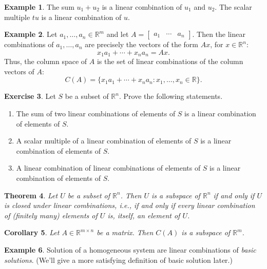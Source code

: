 \documentclass{amsart}
\newcommand{\RR}{\mathbb{R}}
\newtheorem{theorem}{Theorem}[section]
\newtheorem{corollary}[theorem]{Corollary}
\theoremstyle{definition}
\newtheorem{example}[theorem]{Example}
\newtheorem{exercise}[theorem]{Exercise}
\begin{document}
\begin{example}
  The sum $u_1+u_2$ is a linear combination of $u_1$ and $u_2$.
  The scalar multiple $tu$ is a linear combination of $u$.
\end{example}

\begin{example}\label{example:lin_combs_are_matvecs}
Let $a_1,\ldots,a_n\in\RR^m$ and let $A=\begin{bmatrix}a_1&\cdots &a_n\end{bmatrix}$.
  Then the linear combinations of $a_1,\ldots,a_n$ are precisely the vectors of the form $Ax$, for $x\in \RR^n$:
  $$
  x_1a_1+\cdots + x_na_n = Ax.
  $$
  Thus, the column space of $A$ is the set of linear combinations of the column vectors of $A$:
  $$
  C(A) = \{x_1a_1+\cdots+x_na_n : x_1, \ldots, x_n\in \RR\}.
  $$
\end{example}

\begin{exercise}\label{exerise:spans_are_subspaces}
Let $S$ be a subset of $\RR^n$. Prove the following statements.
\begin{enumerate}
  \item The sum of two linear combinations of elements of $S$ is a linear combination of elements of $S$.
  \item A scalar multiple of a linear combination of elements of $S$ is a linear combination of elements of $S$.
  \item A linear combination of linear combinations of elements of $S$ is a linear combination of elements of $S$.
\end{enumerate}
\end{exercise}

\begin{theorem}\label{theorem:subspaces_closed_under_lin_comb}
  Let $U$ be a subset of $\RR^n$.
  Then $U$ is a subspace of $\RR^n$ if and only if $U$ is \emph{closed under linear combinations}, i.e., if and only if every linear combination of (finitely many) elements of $U$ is, itself, an element of $U$.
\end{theorem}

\begin{corollary}
  Let $A\in\RR^{m\times n}$ be a matrix. Then $C(A)$ is a subspace of $\RR^m$.
\end{corollary}

\begin{example}
  Solution of a homogeneous system are linear combinations of \emph{basic solutions}.
  (We'll give a more satisfying definition of basic solution later.)
\end{example}
\end{document}
